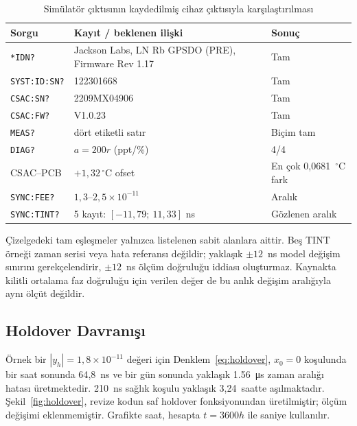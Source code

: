 \documentclass[9pt,twocolumn,a4paper]{extarticle}
\begin{document}
\begin{table}[t]
\caption{Simülatör çıktısının kaydedilmiş cihaz çıktısıyla karşılaştırılması}
\label{tab:compare}
\centering
\fontsize{9}{10.8}\selectfont
\setlength{\tabcolsep}{3pt}
\begin{tabular}{p{}p{}p{}}
\toprule
\textbf{Sorgu} & \textbf{Kayıt / beklenen ilişki} & \textbf{Sonuç} \\
\midrule
\texttt{*IDN?} & Jackson Labs, LN Rb GPSDO (PRE), Firmware Rev 1.17 & Tam \\
\texttt{SYST:ID:SN?} & 122301668 & Tam \\
\texttt{CSAC:SN?} & 2209MX04906 & Tam \\
\texttt{CSAC:FW?} & V1.0.23 & Tam \\
\texttt{MEAS?} & dört etiketli satır & Biçim tam \\
\texttt{DIAG?} & $a=200r$ (ppt/\%) & 4/4 \\
CSAC--PCB & $+1{,}32\,^{\circ}$C ofset & En çok 0{,}0681~$^{\circ}$C fark \\
\texttt{SYNC:FEE?} & $1{,}3$--$2{,}5\times10^{-11}$ & Aralık \\
\texttt{SYNC:TINT?} & 5 kayıt: $[-11{,}79;\ 11{,}33]$ ns & Gözlenen aralık \\
\bottomrule
\end{tabular}
\end{table}

Çizelgedeki tam eşleşmeler yalnızca listelenen sabit alanlara aittir. Beş TINT örneği zaman serisi veya hata referansı değildir; yaklaşık $\pm12$~ns model değişim sınırını gerekçelendirir, $\pm12$~ns ölçüm doğruluğu iddiası oluşturmaz. Kaynakta kilitli ortalama faz doğruluğu için verilen değer de bu anlık değişim aralığıyla aynı ölçüt değildir.

\subsection{Holdover Davranışı}
Örnek bir $|y_h|=1{,}8\times10^{-11}$ değeri için Denklem~\ref{eq:holdover}, $x_0=0$ koşulunda bir saat sonunda 64{,}8~ns ve bir gün sonunda yaklaşık \SI{1.56}{\micro\second} zaman aralığı hatası üretmektedir. 210~ns sağlık koşulu yaklaşık 3{,}24~saatte aşılmaktadır. Şekil~\ref{fig:holdover}, revize kodun saf holdover fonksiyonundan üretilmiştir; ölçüm değişimi eklenmemiştir. Grafikte saat, hesapta $t=3600h$ ile saniye kullanılır.
\end{document}
